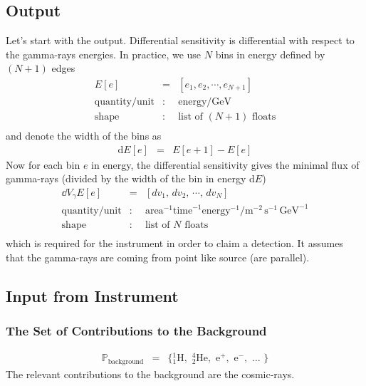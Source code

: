 \documentclass{article}%
\begin{document}
        \subsection{Output}
            Let's start with the output.
            Differential sensitivity is differential with respect to the gamma-rays energies.
            In practice, we use $N$ bins in energy defined by $(N+1)$ edges
            \begin{eqnarray*}
                E[e] &=& [e_1, e_2, \cdots, e_{N+1}]\\
                \text{quantity}/\text{unit} &:& \text{energy} / \text{GeV}\\
                \text{shape} &:& \text{list of}\,\,(N + 1)\,\,\text{floats}\\
            \end{eqnarray*}
            and denote the width of the bins as
            \begin{eqnarray*}
                \text{d}E[e] &=& E[e+1] - E[e]
            \end{eqnarray*}
            Now for each bin $e$ in energy, the differential sensitivity gives the minimal flux of gamma-rays (divided by the width of the bin in energy d$E$)
            \begin{eqnarray*}
                \dd{V_\gamma}{E}[e] &=& [dv_1, \, dv_2, \, \cdots, \, dv_N]\\
                \text{quantity}/\text{unit} &:& \text{area}^{-1} \text{time}^{-1} \text{energy}^{-1} / \text{m}^{-2}\,\text{s}^{-1}\,\text{GeV}^{-1}\\
                \text{shape} &:& \text{list of}\,\,N\,\,\text{floats}\\
            \end{eqnarray*}
            which is required for the instrument in order to claim a detection.
            It assumes that the gamma-rays are coming from point like source (are parallel).
        \subsection{Input from Instrument}
            \subsubsection*{The Set of Contributions to the Background}
                \begin{eqnarray*}
                    \mathbb{P}_\text{background} &=& \{
                    {_1^1}\text{H},\,\,
                    {_2^4}\text{He},\,\,
                    \text{e}^{+},\,\,
                    \text{e}^{-},\,\,
                    \dots{}\,\,
                    \}
                \end{eqnarray*}
                The relevant contributions to the background are the cosmic-rays.
\end{document}
